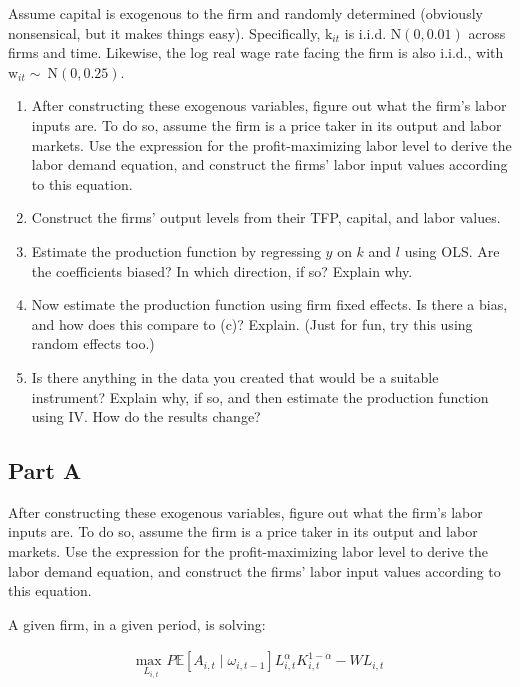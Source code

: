 \documentclass[10pt]{article}
\begin{document}
Assume capital is exogenous to the firm and randomly determined (obviously 
nonsensical, but it makes things easy). Specifically, $\mathrm{k}_{i t}$ is 
i.i.d. $\mathrm{N}(0,0.01)$ across firms and time. Likewise, the log real wage 
rate facing the firm is also i.i.d., with $\mathrm{w}_{i t} \sim \mathrm{~N}(0,0.25)$.

\begin{enumerate}[label=\alph*.]
    \item After constructing these exogenous variables, figure out what the firm's labor inputs are. To do so, assume the firm is a price taker in its output and labor markets. Use the expression for the profit-maximizing labor level to derive the labor demand equation, and construct the firms' labor input values according to this equation.
    \item Construct the firms' output levels from their TFP, capital, and labor values.
    \item Estimate the production function by regressing $y$ on $k$ and $l$ using OLS. Are the coefficients biased? In which direction, if so? Explain why.
    \item Now estimate the production function using firm fixed effects. Is there a bias, and how does this compare to (c)? Explain. (Just for fun, try this using random effects too.)
    \item Is there anything in the data you created that would be a suitable instrument? Explain why, if so, and then estimate the production function using IV. How do the results change?
\end{enumerate}

\subsection{Part A}

After constructing these exogenous variables, figure out what the firm's labor inputs are. To do so, assume the firm is a price taker in its output and labor markets. Use the expression for the profit-maximizing labor level to derive the labor demand equation, and construct the firms' labor input values according to this equation.

\hrulefill\hspace{0.5em}\dotfill\hspace{0.5em}\hrulefill

A given firm, in a given period, is solving:

\begin{align}
    \underset{L_{i,t}}{\text{max }} P \mathbb{E}[A_{i,t} \mid \omega_{i, t-1}] L_{i,t}^\alpha K_{i,t}^{1-\alpha}-W L_{i,t}
\end{align}
\end{document}
